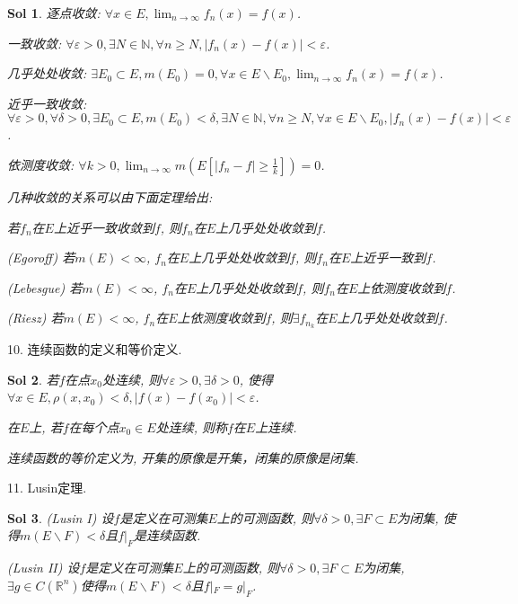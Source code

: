 \documentclass[UTF8]{article}
\newtheorem{solution}{Sol}
\begin{document}
    \begin{solution}
        逐点收敛: $\forall x\in E, \lim_{n \to \infty}f_n(x)=f(x)$.\par
        一致收敛: $\forall \varepsilon>0, \exists N\in \mathbb{N}, \forall n\geqslant N, |f_n(x)-f(x)|<\varepsilon$.\par
        几乎处处收敛: $\exists E_0\subset E, m(E_0) = 0, \forall x\in E\backslash E_0, \lim_{n \to \infty}f_n(x)=f(x)$.\par
        近乎一致收敛: $\forall \varepsilon>0, \forall \delta > 0, \exists E_0\subset E, m(E_0) < \delta, \exists N\in \mathbb{N}, \forall n\geqslant N, \forall x\in E\backslash E_0, |f_n(x)-f(x)|<\varepsilon$.\par
        依测度收敛: $\forall k >0, \lim_{n \to \infty}m(E[|f_n-f|\geqslant \frac{1}{k}])=0$.\par
        几种收敛的关系可以由下面定理给出:\par
        若$f_n$在$E$上近乎一致收敛到$f$, 则$f_n$在$E$上几乎处处收敛到$f$.\par
        (Egoroff) 若$m(E)<\infty$, $f_n$在$E$上几乎处处收敛到$f$, 则$f_n$在$E$上近乎一致到$f$.\par
        (Lebesgue) 若$m(E)<\infty$, $f_n$在$E$上几乎处处收敛到$f$, 则$f_n$在$E$上依测度收敛到$f$.\par
        (Riesz) 若$m(E)<\infty$, $f_n$在$E$上依测度收敛到$f$, 则$\exists f_{n_k}$在$E$上几乎处处收敛到$f$.\par
    \end{solution}
    10. 连续函数的定义和等价定义.\par
    \begin{solution}
        若$f$在点$x_0$处连续, 则$\forall \varepsilon > 0, \exists \delta > 0$, 使得$\forall x\in E, \rho(x,x_0)<\delta, |f(x)-f(x_0)|<\varepsilon$.\par
        在$E$上, 若$f$在每个点$x_0\in E$处连续, 则称$f$在$E$上连续.\par
        连续函数的等价定义为, 开集的原像是开集，闭集的原像是闭集.\par
    \end{solution}
    11. Lusin定理.\par
    \begin{solution}
        (Lusin I) 设$f$是定义在可测集$E$上的可测函数, 则$\forall \delta >0, \exists F\subset E$为闭集, 使得$m(E\backslash F)<\delta$且$f|_F$是连续函数.\par
        (Lusin II) 设$f$是定义在可测集$E$上的可测函数, 则$\forall \delta >0, \exists F\subset E$为闭集, $\exists g\in C(\mathbb{R}^n)$使得$m(E\backslash F)<\delta$且$f|_F=g|_F$.\par
    \end{solution}
\end{document}
